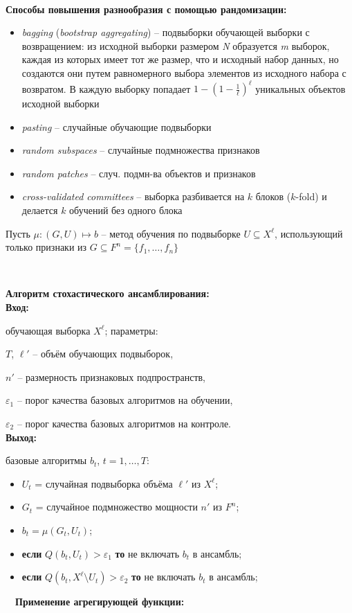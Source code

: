\ \

\textbf{Способы повышения разнообразия с помощью рандомизации:}
\begin{itemize}
    \item \textit{bagging} (\textit{bootstrap aggregating}) – подвыборки обучающей выборки с возвращением: из исходной выборки размером \textit{N} образуется \textit{m} выборок, каждая из которых имеет тот же размер, что и исходный набор данных, но создаются они путем равномерного выбора элементов из исходного набора с возвратом. В каждую выборку попадает $1 - (1 - \frac{1}{\ell})^\ell$ уникальных объектов исходной выборки
    \item \textit{pasting} – случайные обучающие подвыборки
    \item \textit{random subspaces} – случайные подмножества признаков
    \item \textit{random patches} – случ. подмн-ва объектов и признаков
    \item \textit{cross-validated committees} – выборка разбивается на $k$ блоков ($k$-fold) и делается $k$ обучений без одного блока
\end{itemize}
Пусть $\mu: (G, U) \mapsto b$ – метод обучения по подвыборке $U \subseteq X^\ell$, использующий только признаки из $G \subseteq F^n = \{f_1, \dots, f_n\}$

\ \

\textbf{Алгоритм стохастического ансамблирования:}
\\
\textbf{Вход:}

обучающая выборка $X^\ell$; параметры:

$T$, $\ell'$ – объём обучающих подвыборок,

$n'$ – размерность признаковых подпространств,

$\varepsilon_1$ – порог качества базовых алгоритмов на обучении,

$\varepsilon_2$ – порог качества базовых алгоритмов на контроле.
\\
\textbf{Выход:}

базовые алгоритмы $b_t$,  $t = 1, \dots, T$:
\begin{itemize}
    \item $U_t$ = случайная подвыборка объёма $\ell'$ из $X^\ell$;
    \item $G_t$ = случайное подмножество мощности $n'$ из $F^n$;
    \item $b_t = \mu(G_t, U_t)$; %
    \item \textbf{если} $Q(b_t, U_t) > \varepsilon_1$ \textbf{то} не включать $b_t$ в ансамбль;
    \item \textbf{если} $Q(b_t, X^\ell \setminus U_t) > \varepsilon_2$ \textbf{то} не включать $b_t$ в ансамбль;
\end{itemize}
\ \
\textbf{Применение агрегирующей функции:}

